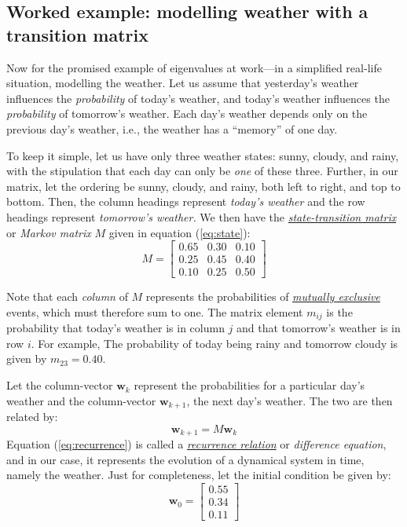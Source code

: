 \documentclass[
  12pt,
  a4paper,
]{article}
\begin{document}
\hypertarget{worked-example-modelling-weather-with-a-transition-matrix}{%
\subsection{Worked example: modelling weather with a transition
matrix}\label{worked-example-modelling-weather-with-a-transition-matrix}}

Now for the promised example of eigenvalues at work---in a simplified
real-life situation, modelling the weather. Let us assume that
yesterday's weather influences the \emph{probability} of today's
weather, and today's weather influences the \emph{probability} of
tomorrow's weather. Each day's weather depends only on the previous
day's weather, i.e., the weather has a ``memory'' of one day.

To keep it simple, let us have only three weather states: sunny, cloudy,
and rainy, with the stipulation that each day can only be \emph{one} of
these three. Further, in our matrix, let the ordering be sunny, cloudy,
and rainy, both left to right, and top to bottom. Then, the column
headings represent \emph{today's weather} and the row headings represent
\emph{tomorrow's weather.} We then have the
\href{https://en.wikipedia.org/wiki/Stochastic_matrix}{\emph{state-transition
matrix}} or \emph{Markov matrix} \(M\) given in equation
(\ref{eq:state}): \begin{equation}
M = \begin{bmatrix}
0.65 & 0.30 & 0.10\\
0.25 & 0.45 & 0.40\\
0.10 & 0.25 & 0.50
\end{bmatrix}
\label{eq:state}\end{equation}

Note that each \emph{column} of \(M\) represents the probabilities of
\href{https://en.wikipedia.org/wiki/Mutual_exclusivity}{\emph{mutually
exclusive}} events, which must therefore sum to one. The matrix element
\(m_{ij}\) is the probability that today's weather is in column \(j\)
and that tomorrow's weather is in row \(i\). For example, The
probability of today being rainy and tomorrow cloudy is given by
\(m_{23} = 0.40\).

Let the column-vector \(\boldsymbol{w}_{k}\) represent the probabilities
for a particular day's weather and the column-vector
\(\boldsymbol{ w}_{k+1}\), the next day's weather. The two are then
related by: \begin{equation}
\boldsymbol{w}_{k+1} = M\boldsymbol{w}_{k}
\label{eq:recurrence}\end{equation} Equation (\ref{eq:recurrence}) is
called a
\href{https://en.wikipedia.org/wiki/Recurrence_relation}{\emph{recurrence
relation}} or \emph{difference equation}, and in our case, it represents
the evolution of a dynamical system in time, namely the weather. Just
for completeness, let the initial condition be given by:
\begin{equation}
\boldsymbol{w}_{0} = \begin{bmatrix}0.55\\0.34\\0.11\end{bmatrix}
\label{eq:initial}\end{equation}
\end{document}
